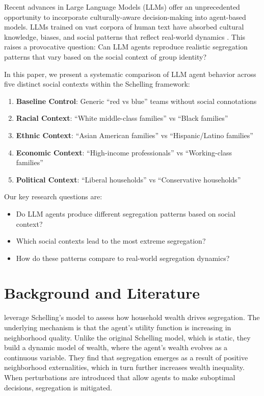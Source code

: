 \documentclass[pdflatex,sn-basic]{sn-jnl}%
\providecommand{\tightlist}{%
  \setlength{\itemsep}{0pt}\setlength{\parskip}{0pt}}
\begin{document}
Recent advances in Large Language Models (LLMs) offer an unprecedented
opportunity to incorporate culturally-aware decision-making into
agent-based models. LLMs trained on vast corpora of human text have
absorbed cultural knowledge, biases, and social patterns that reflect
real-world dynamics \citep{park2023generative,argyle2023out}. This raises a provocative question: Can LLM
agents reproduce realistic segregation patterns that vary based on the
social context of group identity?

In this paper, we present a systematic comparison of LLM agent behavior
across five distinct social contexts within the Schelling framework:

\begin{enumerate}
\tightlist
\item
  \textbf{Baseline Control}: Generic ``red vs blue'' teams without
  social connotations
\item
  \textbf{Racial Context}: ``White middle-class families'' vs ``Black
  families''
\item
  \textbf{Ethnic Context}: ``Asian American families'' vs
  ``Hispanic/Latino families''
\item
  \textbf{Economic Context}: ``High-income professionals'' vs
  ``Working-class families''
\item
  \textbf{Political Context}: ``Liberal households'' vs ``Conservative
  households''
\end{enumerate}

Our key research questions are: 
\begin{itemize}
\item Do LLM agents produce different
segregation patterns based on social context? 
\item Which social contexts
lead to the most extreme segregation? 
\item How do these patterns compare to
real-world segregation dynamics?
\end{itemize}

\section{Background and Literature} %
\label{sec:background_and_literature}


\citet{vicario2024dynamic} leverage Schelling's model to assess how household wealth drives segregation. The underlying mechanism is that the agent's utility function is increasing in neighborhood quality.
 Unlike the original Schelling model, which is static, they build a dynamic model of wealth, where the agent's wealth evolves as a continuous variable. They find that segregation emerges as a result of positive neighborhood externalities, which in turn further increases wealth inequality. When perturbations are introduced that allow agents to make suboptimal decisions, segregation is mitigated.
\end{document}
